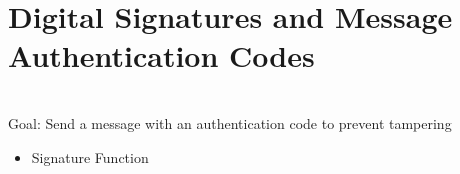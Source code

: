 \section{Digital Signatures and Message Authentication Codes}
\\Goal: Send a message with an authentication code to prevent tampering
\begin{itemize}
\item Signature Function
\end{itemize}